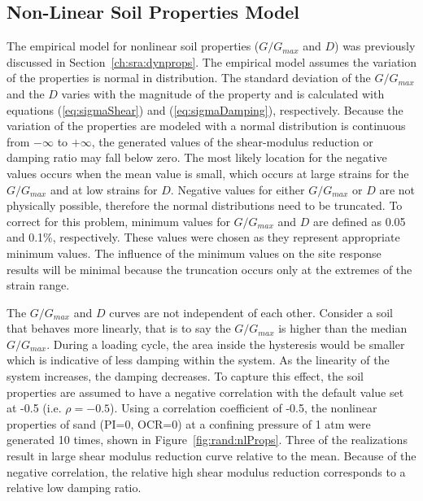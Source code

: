 \documentclass[12pt,oneside]{book}
\begin{document}
\subsection{Non-Linear Soil Properties Model} 
The \citet{darendeli:01} empirical model for nonlinear soil properties ($G/G_{max}$ and $D$) was
previously discussed in Section~\ref{ch:sra:dynprops}.  The \citet{darendeli:01} empirical
model assumes the variation of the properties is normal in distribution.  The standard deviation of
the $G/G_{max}$ and the $D$ varies with the magnitude of the property and is calculated with
equations (\ref{eq:sigmaShear}) and (\ref{eq:sigmaDamping}), respectively.  Because the variation of
the properties are modeled with a normal distribution is continuous from $-\infty$ to $+\infty$, the
generated values of the shear-modulus reduction or damping ratio may fall below zero.  The most
likely location for the negative values occurs when the mean value is small, which occurs at large
strains for the $G/G_{max}$ and at low strains for $D$.  Negative values for either $G/G_{max}$ or
$D$ are not physically possible, therefore the normal distributions need to be truncated.  To
correct for this problem, minimum values for $G/G_{max}$ and $D$ are defined as 0.05 and 0.1\%,
respectively.  These values were chosen as they represent appropriate minimum values.  The influence
of the minimum values on the site response results will be minimal because the truncation occurs
only at the extremes of the strain range.

The $G/G_{max}$ and $D$ curves are not independent of each other.  Consider a soil that behaves
more linearly, that is to say the $G/G_{max}$ is higher than the median $G/G_{max}$.  During a
loading cycle, the area inside the hysteresis would be smaller which is indicative of less damping
within the system.  As the linearity of the system increases, the damping decreases.  To capture
this effect, the soil properties are assumed to have a negative correlation with the default value
set at -0.5 (i.e.  $\rho=-0.5$).  Using a correlation coefficient of -0.5, the nonlinear properties
of sand (PI=0, OCR=0) at a confining pressure of 1 atm were generated 10 times, shown in
Figure~\ref{fig:rand:nlProps}.  Three of the realizations result in large shear modulus reduction
curve relative to the mean.  Because of the negative correlation, the relative high shear modulus
reduction corresponds to a relative low damping ratio.
\end{document}
